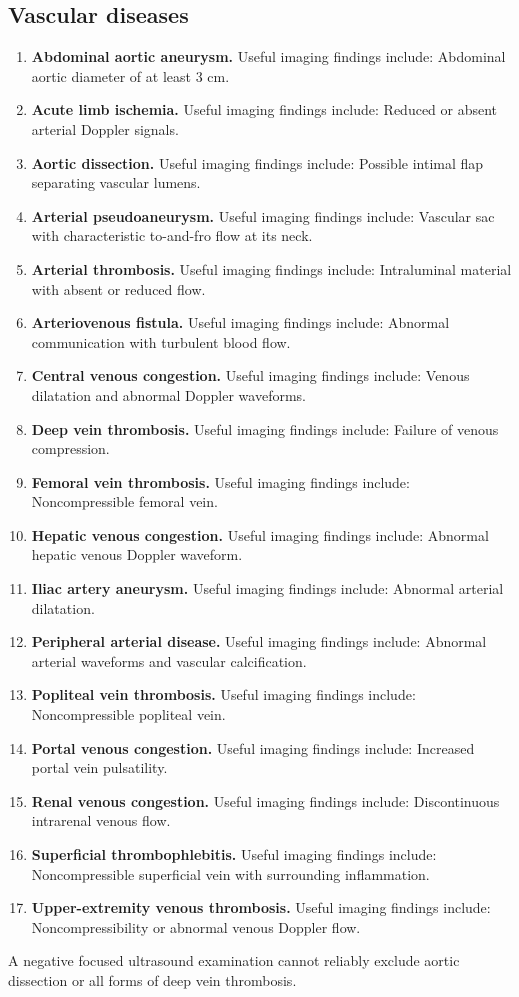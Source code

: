 \subsection{Vascular diseases}
\begin{enumerate}[leftmargin=*,itemsep=0.45em,topsep=0.4em]
\item \textbf{Abdominal aortic aneurysm.} Useful imaging findings include: Abdominal aortic diameter of at least 3 cm.
\item \textbf{Acute limb ischemia.} Useful imaging findings include: Reduced or absent arterial Doppler signals.
\item \textbf{Aortic dissection.} Useful imaging findings include: Possible intimal flap separating vascular lumens.
\item \textbf{Arterial pseudoaneurysm.} Useful imaging findings include: Vascular sac with characteristic to-and-fro flow at its neck.
\item \textbf{Arterial thrombosis.} Useful imaging findings include: Intraluminal material with absent or reduced flow.
\item \textbf{Arteriovenous fistula.} Useful imaging findings include: Abnormal communication with turbulent blood flow.
\item \textbf{Central venous congestion.} Useful imaging findings include: Venous dilatation and abnormal Doppler waveforms.
\item \textbf{Deep vein thrombosis.} Useful imaging findings include: Failure of venous compression.
\item \textbf{Femoral vein thrombosis.} Useful imaging findings include: Noncompressible femoral vein.
\item \textbf{Hepatic venous congestion.} Useful imaging findings include: Abnormal hepatic venous Doppler waveform.
\item \textbf{Iliac artery aneurysm.} Useful imaging findings include: Abnormal arterial dilatation.
\item \textbf{Peripheral arterial disease.} Useful imaging findings include: Abnormal arterial waveforms and vascular calcification.
\item \textbf{Popliteal vein thrombosis.} Useful imaging findings include: Noncompressible popliteal vein.
\item \textbf{Portal venous congestion.} Useful imaging findings include: Increased portal vein pulsatility.
\item \textbf{Renal venous congestion.} Useful imaging findings include: Discontinuous intrarenal venous flow.
\item \textbf{Superficial thrombophlebitis.} Useful imaging findings include: Noncompressible superficial vein with surrounding inflammation.
\item \textbf{Upper-extremity venous thrombosis.} Useful imaging findings include: Noncompressibility or abnormal venous Doppler flow.
\end{enumerate}
A negative focused ultrasound examination cannot reliably exclude aortic dissection or all forms of deep vein thrombosis.


